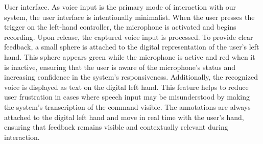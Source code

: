 \documentclass[preprint,12pt]{elsarticle}
\newcommand{\reftext}[1]{{\color{gray}#1}}   %
\begin{document}
\reftext{User interface. As voice input is the primary mode of interaction with our system, the user interface is intentionally minimalist. When the user presses the trigger on the left-hand controller, the microphone is activated and begins recording. Upon release, the captured voice input is processed. To provide clear feedback, a small sphere is attached to the digital representation of the user's left hand. This sphere appears green while the microphone is active and red when it is inactive, ensuring that the user is aware of the microphone's status and increasing confidence in the system's responsiveness. Additionally, the recognized voice is displayed as text on the digital left hand. This feature helps to reduce user frustration in cases where speech input may be misunderstood by making the system's transcription of the command visible. The annotations are always attached to the digital left hand and move in real time with the user's hand, ensuring that feedback remains visible and contextually relevant during interaction.}
\end{document}
